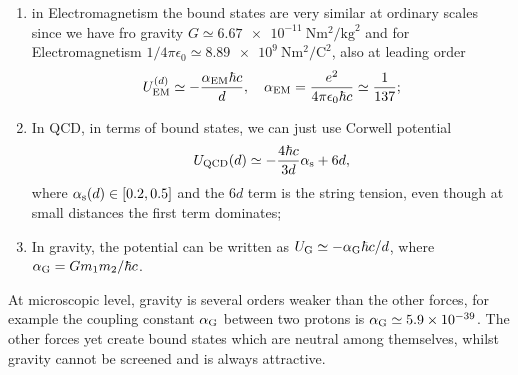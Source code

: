 \begin{enumerate}
    \item in Electromagnetism the bound states are very similar at ordinary scales since we have fro gravity $G \simeq \SI{6.67e-11}{\newton\meter\squared\per\kilogram\squared}$ and for Electromagnetism $1/4\pi\epsilon_0 \simeq \SI{8.89e9}{\newton\meter\squared\per\coulomb\squared}$, also at leading order 
    \begin{equation}
        U_{\mathrm{EM}}^{(d)} \simeq -\frac{\alpha_{\mathrm{EM}}\hbar c}{d},\quad \alpha_{\mathrm{EM}} = \frac{e^2}{4\pi \epsilon_0\hbar c} \simeq \frac{1}{137};
    \end{equation}
    \item In QCD, in terms of bound states, we can just use Corwell potential
    \begin{equation}
        U_{\mathrm{QCD}}(d) \simeq -\frac{4\hbar c}{3d}\alpha_{\mathrm{s}} + 6d,
    \end{equation}
    where $\alpha_{\mathrm{s}}(d) \in [0.2,0.5]$ and the $6d$ term is the string tension, even though at small distances the first term dominates;
    \item In gravity, the potential can be written as $U_{\mathrm{G}} \simeq -\alpha_{\mathrm{G}}\hbar c/d$, where $\alpha_{\mathrm{G}} = Gm_1m_2/\hbar c$.
\end{enumerate}
At microscopic level, gravity is several orders weaker than the other forces, for example the coupling constant $\alpha_{\mathrm{G}}$ between two protons is $\alpha_{\mathrm{G}} \simeq 5.9 \times 10^{-39}$. The other forces yet create bound states which are neutral among themselves, whilst gravity cannot be screened and is always attractive. 

